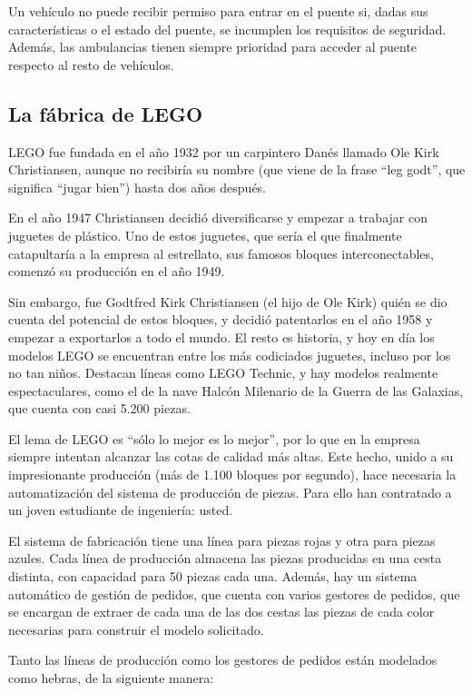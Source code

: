 \documentclass[a4paper]{article}
\begin{document}
Un vehículo no puede recibir permiso para entrar en el puente si, dadas sus características o el estado del puente, se incumplen los requisitos de seguridad. Además, las ambulancias tienen siempre prioridad para acceder al puente respecto al resto de vehículos.

\subsection{La fábrica de LEGO}

LEGO fue fundada en el año 1932 por un carpintero Danés llamado Ole Kirk Christiansen, aunque no recibiría su nombre (que viene de la frase ``leg godt'', que significa ``jugar bien'') hasta dos años después.

En el año 1947 Christiansen decidió diversificarse y empezar a trabajar con juguetes de plástico. Uno de estos juguetes, que sería el que finalmente catapultaría a la empresa al estrellato, sus famosos bloques interconectables, comenzó su producción en el año 1949.

Sin embargo, fue Godtfred Kirk Christiansen (el hijo de Ole Kirk) quién se dio cuenta del potencial de estos bloques, y decidió patentarlos en el año 1958 y empezar a exportarlos a todo el mundo. El resto es historia, y hoy en día los modelos LEGO se encuentran entre los más codiciados juguetes, incluso por los no tan niños. Destacan líneas como LEGO Technic, y hay modelos realmente espectaculares, como el de la nave Halcón Milenario de la Guerra de las Galaxias, que cuenta con casi 5.200 piezas.

El lema de LEGO es ``sólo lo mejor es lo mejor'', por lo que en la empresa siempre intentan alcanzar las cotas de calidad más altas. Este hecho, unido a su impresionante producción (más de 1.100 bloques por segundo), hace necesaria la automatización del sistema de producción de piezas. Para ello han contratado a un joven estudiante de ingeniería: usted.

El sistema de fabricación tiene una línea para piezas rojas y otra para piezas azules. Cada línea de producción almacena las piezas producidas en una cesta distinta, con capacidad para 50 piezas cada una. Además, hay un sistema automático de gestión de pedidos, que cuenta con varios gestores de pedidos, que se encargan de extraer de cada una de las dos cestas las piezas de cada color necesarias para construir el modelo solicitado.

Tanto las líneas de producción como los gestores de pedidos están modelados como hebras, de la siguiente manera:
\end{document}
